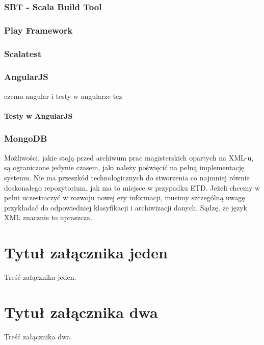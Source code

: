 \documentclass[brudnopis]{xmgr}
\begin{document}
\subsection{SBT - Scala Build Tool}

\subsection{Play Framework}

\subsection{Scalatest}

\subsection{AngularJS}

czemu angular i testy w angularze tez

\subsubsection{Testy w AngularJS}

\subsection{MongoDB}

\summary
Możliwości, jakie stoją przed archiwum prac magisterskich opartych na
XML-u, są ograniczone jedynie czasem, jaki należy poświęcić na pełną
implementację systemu. Nie ma przeszkód technologicznych do stworzenia
co najmniej równie doskonałego repozytorium, jak ma to miejsce w
przypadku ETD. Jeżeli chcemy w pełni uczestniczyć w rozwoju nowej ery
informacji, musimy szczególną uwagę przykładać do odpowiedniej
klasyfikacji i archiwizacji danych. Sądzę, że język XML znacznie to
upraszcza.

\appendix
\chapter{Tytuł załącznika jeden}

Treść załącznika jeden.

\chapter{Tytuł załącznika dwa}

Treść załącznika dwa.




\listoftables

\listoffigures

\oswiadczenie
\end{document}
